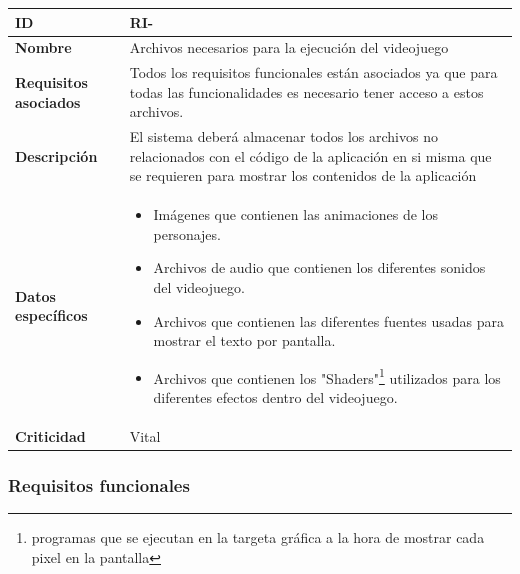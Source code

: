 \begin{center}
	\begin{tabular}{ | p{4.5cm} | p{10cm} | } 
		\hline
		
		\textbf{ID} & RI-\arabic{contador_requisitos_de_informacion}
		{contador_requisitos_de_informacion} \\
		
		\hline 
		
		\textbf{Nombre} &
		Archivos necesarios para la ejecución del videojuego\\ 
		
		\hline
		
		\textbf{Requisitos asociados} & 
		Todos los requisitos funcionales están asociados ya que para todas las funcionalidades es necesario tener acceso a estos archivos.\\
		
		\hline
		
		\textbf{Descripción} & 
		El sistema deberá almacenar todos los archivos no relacionados con el código de la aplicación en si misma que se requieren para mostrar los contenidos de la aplicación\\
		
		\hline 
		
		\textbf{Datos específicos} &
		\begin{itemize}
			\item Imágenes que contienen las animaciones de los personajes.
			\item Archivos de audio que contienen los diferentes sonidos del videojuego.
			\item Archivos que contienen las diferentes fuentes usadas para mostrar el texto por pantalla.
			\item Archivos que contienen los "Shaders"\footnote{programas que se ejecutan en la targeta gráfica a la hora de mostrar cada pixel en la pantalla} utilizados para los diferentes efectos dentro del videojuego.
		\end{itemize}\\
		
		\hline 
		
		\textbf{Criticidad} &
		Vital\\
		
		\hline
	\end{tabular}
\end{center}



\subsubsection{Requisitos funcionales}

